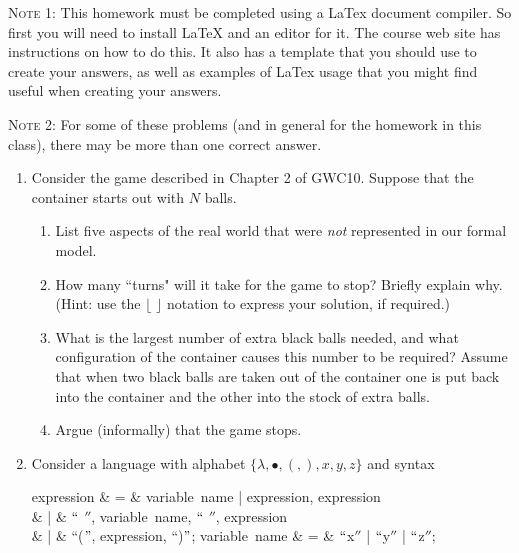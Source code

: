 \documentclass{article}
\begin{document}

\noindent\textsc{Note 1}: This homework must be completed using a
LaTex document compiler. So first you will need to install LaTeX and
an editor for it. The course web site has instructions on how to do
this. It also has a template that you should use to create your
answers, as well as examples of LaTex usage
that you might find useful when creating your answers. \vspace {3pt}

\noindent\textsc{Note 2}: For some of these problems (and in general
for the homework in this class), there may be more than one correct
answer.\vspace {3pt}


\begin{enumerate}
 \item Consider the game described in Chapter 2 of GWC10. Suppose that
    the container starts out with $N$ balls.
    \begin{enumerate}
        \item List five aspects of the real world that were \emph{not}
        represented in our formal model.
        \item How many ``turns" will it take for the game to stop? Briefly explain why. (Hint: use the $\lfloor$ $\rfloor$ notation to express your solution, if required.)
        \item What is the largest number of extra black balls
        needed, and what configuration of the container causes this number to be required?
        Assume that when two black balls are taken out of the container one is put back into the container and the other into the stock of extra balls.
        \item Argue (informally) that the game stops.
    \end{enumerate}

 \item
Consider a language with alphabet $\{ \lambda, \bullet, (, ), x, y, z \}$ and syntax

 \begin{syntax}
     expression  & =  & variable~name | expression, expression\\
     & | & $``$ \lambda $''$, variable~name, $``$ \bullet $''$, expression\\
     & | & ``($"$, expression, ``)$"$;
     \also
     variable~name & = & $``$x$''$ | $``$y$''$ | $``$z$''$;
 \end{syntax}


\end{enumerate}
\end{document}
